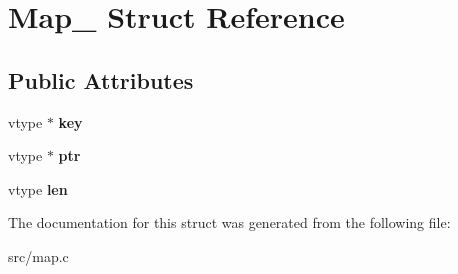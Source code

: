 \hypertarget{structMap__}{}\section{Map\+\_\+ Struct Reference}
\label{structMap__}
\subsection*{Public Attributes}
\begin{DoxyCompactItemize}
\item 
\hypertarget{structMap___a2ac7ed7eb55e5b648b9eb9e653f32c0d}{}\label{structMap___a2ac7ed7eb55e5b648b9eb9e653f32c0d} 
vtype $\ast$ {\bfseries key}
\item 
\hypertarget{structMap___aaa841070a6e7a22c4d73fa1568f37aa9}{}\label{structMap___aaa841070a6e7a22c4d73fa1568f37aa9} 
vtype $\ast$ {\bfseries ptr}
\item 
\hypertarget{structMap___a42c817847dcb9580ffff2461e911c0bc}{}\label{structMap___a42c817847dcb9580ffff2461e911c0bc} 
vtype {\bfseries len}
\end{DoxyCompactItemize}


The documentation for this struct was generated from the following file\+:\begin{DoxyCompactItemize}
\item 
src/map.\+c\end{DoxyCompactItemize}
